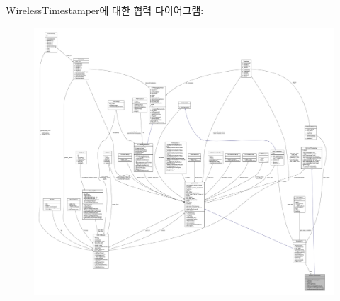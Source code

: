 Wireless\+Timestamper에 대한 협력 다이어그램\+:
\nopagebreak
\begin{figure}[H]
\begin{center}
\leavevmode
\includegraphics[width=350pt]{class_wireless_timestamper__coll__graph}
\end{center}
\end{figure}
